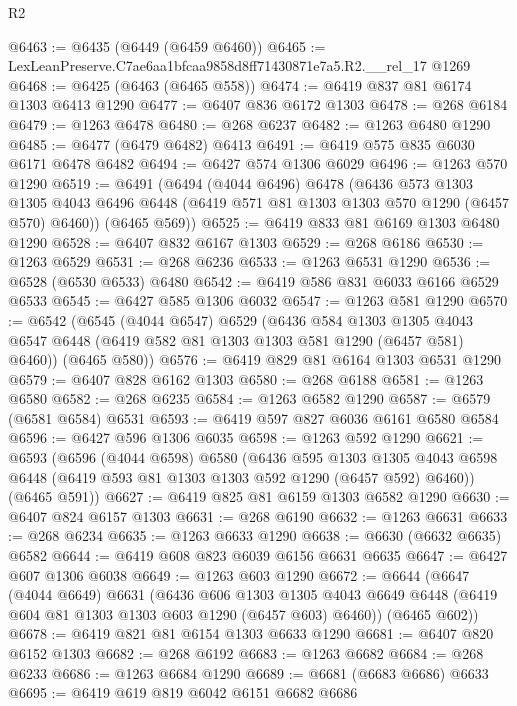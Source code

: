 \begin{lexlean}{R2}
\begin{coremodule}
@6463 := @6435 (@6449 (@6459 @6460))
@6465 := LexLeanPreserve.C7ae6aa1bfcaa9858d8ff71430871e7a5.R2.__rel_17 @1269
@6468 := @6425 (@6463 (@6465 @558))
@6474 := @6419 @837 @81 @6174 @1303 @6413 @1290
@6477 := @6407 @836 @6172 @1303
@6478 := @268 @6184
@6479 := @1263 @6478
@6480 := @268 @6237
@6482 := @1263 @6480 @1290
@6485 := @6477 (@6479 @6482) @6413
@6491 := @6419 @575 @835 @6030 @6171 @6478 @6482
@6494 := @6427 @574 @1306 @6029
@6496 := @1263 @570 @1290
@6519 := @6491
    (@6494
      (@4044 @6496)
      @6478
      (@6436
        @573
        @1303
        @1305
        @4043
        @6496
        @6448
        (@6419 @571 @81 @1303 @1303 @570 @1290 (@6457 @570) @6460))
      (@6465 @569))
@6525 := @6419 @833 @81 @6169 @1303 @6480 @1290
@6528 := @6407 @832 @6167 @1303
@6529 := @268 @6186
@6530 := @1263 @6529
@6531 := @268 @6236
@6533 := @1263 @6531 @1290
@6536 := @6528 (@6530 @6533) @6480
@6542 := @6419 @586 @831 @6033 @6166 @6529 @6533
@6545 := @6427 @585 @1306 @6032
@6547 := @1263 @581 @1290
@6570 := @6542
    (@6545
      (@4044 @6547)
      @6529
      (@6436
        @584
        @1303
        @1305
        @4043
        @6547
        @6448
        (@6419 @582 @81 @1303 @1303 @581 @1290 (@6457 @581) @6460))
      (@6465 @580))
@6576 := @6419 @829 @81 @6164 @1303 @6531 @1290
@6579 := @6407 @828 @6162 @1303
@6580 := @268 @6188
@6581 := @1263 @6580
@6582 := @268 @6235
@6584 := @1263 @6582 @1290
@6587 := @6579 (@6581 @6584) @6531
@6593 := @6419 @597 @827 @6036 @6161 @6580 @6584
@6596 := @6427 @596 @1306 @6035
@6598 := @1263 @592 @1290
@6621 := @6593
    (@6596
      (@4044 @6598)
      @6580
      (@6436
        @595
        @1303
        @1305
        @4043
        @6598
        @6448
        (@6419 @593 @81 @1303 @1303 @592 @1290 (@6457 @592) @6460))
      (@6465 @591))
@6627 := @6419 @825 @81 @6159 @1303 @6582 @1290
@6630 := @6407 @824 @6157 @1303
@6631 := @268 @6190
@6632 := @1263 @6631
@6633 := @268 @6234
@6635 := @1263 @6633 @1290
@6638 := @6630 (@6632 @6635) @6582
@6644 := @6419 @608 @823 @6039 @6156 @6631 @6635
@6647 := @6427 @607 @1306 @6038
@6649 := @1263 @603 @1290
@6672 := @6644
    (@6647
      (@4044 @6649)
      @6631
      (@6436
        @606
        @1303
        @1305
        @4043
        @6649
        @6448
        (@6419 @604 @81 @1303 @1303 @603 @1290 (@6457 @603) @6460))
      (@6465 @602))
@6678 := @6419 @821 @81 @6154 @1303 @6633 @1290
@6681 := @6407 @820 @6152 @1303
@6682 := @268 @6192
@6683 := @1263 @6682
@6684 := @268 @6233
@6686 := @1263 @6684 @1290
@6689 := @6681 (@6683 @6686) @6633
@6695 := @6419 @619 @819 @6042 @6151 @6682 @6686

\end{coremodule}
\end{lexlean}
